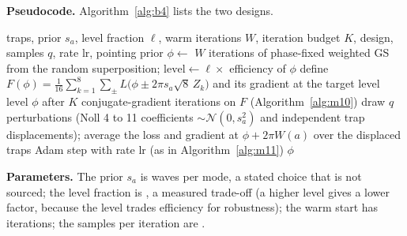 \textbf{Pseudocode.} Algorithm~\ref{alg:b4} lists the two designs.

\begin{algorithm}[t]
\caption{Aberration-robust hologram: the expected loss over residual Zernike aberrations by the sigma-point design (conjugate gradient) or by random draws (Adam).}
\label{alg:b4}
\begin{algorithmic}[1]
\Require traps, prior $s_a$, level fraction $\ell$, warm iterations $W$, iteration budget $K$, design, samples $q$, rate $\mathrm{lr}$, pointing prior
\State $\phi\gets$ $W$ iterations of phase-fixed weighted GS from the random superposition; $\mathrm{level}\gets\ell\times$ efficiency of $\phi$
  \State define $F(\phi)=\frac1{16}\sum_{k=1}^{8}\sum_\pm L\big(\phi\pm2\pi s_a\sqrt8\,Z_k\big)$ and its gradient at the target level $\mathrm{level}$
  \State \Return $\phi$ after $K$ conjugate-gradient iterations on $F$ (Algorithm~\ref{alg:m10})
\Else
    \State draw $q$ perturbations (Noll 4 to 11 coefficients $\sim\mathcal N(0,s_a^2)$ and independent trap displacements); average the loss and gradient at $\phi+2\pi W(a)$ over the displaced traps
    \State Adam step with rate $\mathrm{lr}$ (as in Algorithm~\ref{alg:m11})
  \EndFor
  \State \Return $\phi$
\EndIf
\end{algorithmic}
\end{algorithm}

\textbf{Parameters.} The prior $s_a$ is  waves per mode, a stated choice that is not sourced; the level fraction is , a measured trade-off (a higher level gives a lower factor, because the level trades efficiency for robustness); the warm start has  iterations; the samples per iteration are .

